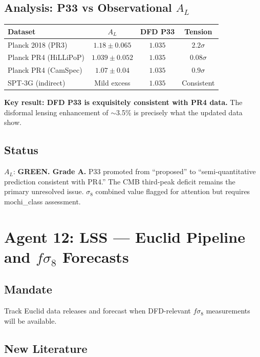 \documentclass[11pt,a4paper]{article}
\begin{document}
\subsection{Analysis: P33 vs Observational $A_L$}

\begin{center}
\begin{tabular}{lccc}
\toprule
\textbf{Dataset} & \textbf{$A_L$} & \textbf{DFD P33} & \textbf{Tension} \\
\midrule
Planck 2018 (PR3) & $1.18 \pm 0.065$ & $1.035$ & $2.2\sigma$ \\
Planck PR4 (HiLLiPoP) & $1.039 \pm 0.052$ & $1.035$ & $0.08\sigma$ \\
Planck PR4 (CamSpec) & $1.07 \pm 0.04$ & $1.035$ & $0.9\sigma$ \\
SPT-3G (indirect) & Mild excess & $1.035$ & Consistent \\
\bottomrule
\end{tabular}
\end{center}

\textbf{Key result: DFD P33 is exquisitely consistent with PR4 data.} The disformal lensing enhancement of $\sim$3.5\% is precisely what the updated data show.

\subsection{Status}
$A_L$: \textbf{GREEN. Grade A.} P33 promoted from ``proposed'' to ``semi-quantitative prediction consistent with PR4.'' The CMB third-peak deficit remains the primary unresolved issue. $\sigma_8$ combined value flagged for attention but requires mochi\_class assessment.

\section{Agent 12: LSS --- Euclid Pipeline and $f\sigma_8$ Forecasts}

\subsection{Mandate}
Track Euclid data releases and forecast when DFD-relevant $f\sigma_8$ measurements will be available.

\subsection{New Literature}
\end{document}
